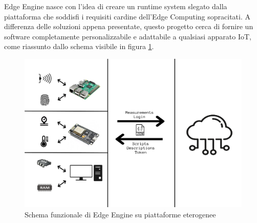Edge Engine nasce con l'idea di creare un runtime system slegato dalla piattaforma che soddisfi i requisiti cardine dell'Edge Computing sopracitati. A differenza delle soluzioni appena presentate, questo progetto cerca di fornire un software completamente personalizzabile e adattabile a qualsiasi apparato IoT, come riassunto dallo schema visibile in figura \ref{edgecomplete}.

\begin{figure}
	\centering
	\includegraphics[width=\linewidth]{pics/edgineCP}
	\caption{Schema funzionale di Edge Engine su piattaforme eterogenee}
	\label{edgecomplete}
\end{figure}